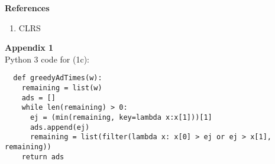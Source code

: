 \documentclass[12pt]{article}
\begin{document}

\newpage

\textbf{References} \\
\hrulefill
\begin{enumerate}
  \item CLRS
\end{enumerate}

\newpage

\textbf{Appendix 1} \\
\hrulefill
Python 3 code for (1c): \\
\begin{verbatim}
  def greedyAdTimes(w):
    remaining = list(w)
    ads = []
    while len(remaining) > 0:
      ej = (min(remaining, key=lambda x:x[1]))[1]
      ads.append(ej)
      remaining = list(filter(lambda x: x[0] > ej or ej > x[1], remaining))
    return ads
\end{verbatim}
\end{document}
